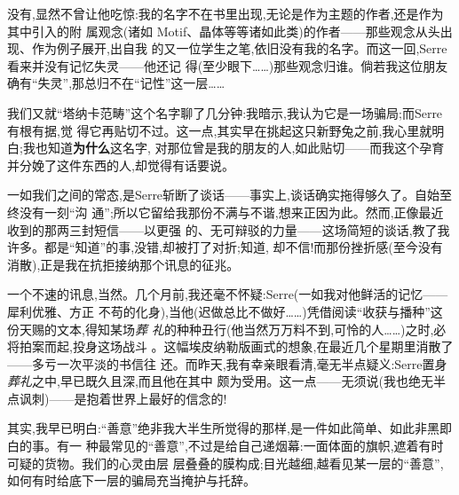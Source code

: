 没有,显然不曾让他吃惊:我的名字不在书里出现,无论是作为主题的作者,还是作为其中引入的附
属观念(诸如 Motif、晶体等等诸如此类)的作者——那些观念\dmark{}从头出现、作为例子展开,出自我
的又一位学生之笔,依旧没有我的名字。而这一回,Serre看来并没有记忆失灵——他还记
得(至少眼下……)那些观念归谁。倘若我这位朋友确有“失灵”,那总归不在“记性”这一层……

我们又就“塔纳卡范畴”这个名字聊了几分钟:我暗示,我认为它是一场骗局;而Serre有根有据,觉
得它再贴切不过。这一点,其实早在挑起这只新野兔之前,我心里就明白;我也知道\textbf{为什么}这名字,
对那位曾是我的朋友的人,如此贴切——而我这个孕育并分娩了这件东西的人,却觉得有话要说。

一如我们之间的常态,是Serre斩断了谈话——事实上,谈话确实拖得够久了。自始至终没有一刻“沟
通”;所以它留给我那份不满与不谐,想来正因为此。然而,正像最近收到的那两三封短信——以更强
的、无可辩驳的力量——这场简短的谈话,教了我许多。都是“知道”的事,没错,却被打了对折;知道,
却不信!而那份挫折感(至今没有消散),正是我在抗拒接纳那个讯息的征兆。

一个不速的讯息,当然。几个月前,我还毫不怀疑:Serre(一如我对他鲜活的记忆——犀利优雅、方正
不苟的化身),当他(迟做总比不做好……)凭借阅读“收获与播种”这份天赐的文本,得知某场\emph{葬
礼}的种种丑行(他当然万万料不到,可怜的人……)之时,必将拍案而起,投身这场战斗
。这幅埃皮纳勒版画式的想象,在\dmark{}最近几个星期里消散了——多亏一次平淡的书信往
还。而昨天,我有幸亲眼看清,毫无半点疑义:Serre置身\emph{葬礼}之中,早已既久且深,而且他在其中
颇为受用。这一点——无须说(我也绝无半点讽刺)——是抱着世界上最好的信念的!

其实,我早已明白:“善意”绝非我大半生所觉得的那样,是一件如此简单、如此非黑即白的事。有一
种最常见的“善意”,不过是给自己递烟幕:一面体面的旗帜,遮着有时可疑的货物。我们的心灵由层
层叠叠的膜构成;目光越细,越看见某一层的“善意”,如何有时给底下一层的骗局充当掩护与托辞。


